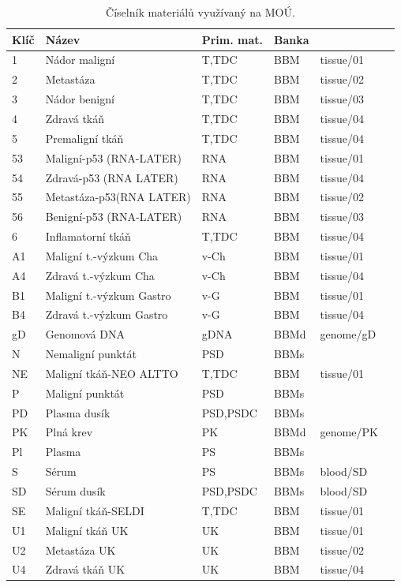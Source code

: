 \begin{table}[ht] 
\centering
\begin{tabular}{l l l l l l}
\hline 
Klíč & Název 	& Prim. mat. & Banka & \ProjectName \\ [0.5ex]  
\hline \hline
1		&	Nádor maligní							&	T,TDC		&		BBM	&	tissue/01 \\
2		&	Metastáza									&	T,TDC		&		BBM	&	tissue/02 \\
3		&	Nádor benigní							&	T,TDC		&		BBM	&	tissue/03 \\
4		&	Zdravá tkáň								&	T,TDC		&		BBM	&	tissue/04 \\
5		&	Premaligní tkáň						&	T,TDC		&		BBM	&	tissue/04 \\
53	&	Maligní-p53 (RNA-LATER)		&	RNA			&		BBM	&	tissue/01 \\
54	&	Zdravá-p53 (RNA LATER)		&	RNA			&		BBM	&	tissue/04 \\
55	&	Metastáza-p53(RNA LATER)	&	RNA			&		BBM	&	tissue/02 \\
56	&	Benigní-p53 (RNA-LATER)		&	RNA			&		BBM	&	tissue/03 \\
6		&	Inflamatorní tkáň					&	T,TDC		&		BBM	&	tissue/04 \\
A1	&	Maligní t.-výzkum Cha			&	v-Ch		&		BBM	&	tissue/01 \\
A4	&	Zdravá t.-výzkum Cha			&	v-Ch		&		BBM	&	tissue/04 \\
B1	&	Maligní t.-výzkum Gastro	&	v-G			&		BBM	&	tissue/01 \\
B4	&	Zdravá t.-výzkum Gastro		&	v-G			&		BBM	&	tissue/04 \\
gD	&	Genomová DNA							&	gDNA		&		BBMd&	genome/gD \\
N		&	Nemaligní punktát					&	PSD			&		BBMs& 					\\	
NE	&	Maligní tkáň-NEO ALTTO		&	T,TDC		&		BBM	&	tissue/01 \\
P		&	Maligní punktát						&	PSD			&		BBMs&	 					\\
PD	&	Plasma dusík							&	PSD,PSDC&		BBMs&	 					\\
PK	&	Plná krev									&	PK			&		BBMd&	genome/PK \\
Pl	&	Plasma										&	PS			&		BBMs& 	 				\\
S~	&	Sérum											&	PS			&		BBMs&	blood/SD 	\\
SD	&	Sérum dusík								&	PSD,PSDC&		BBMs&	blood/SD 	\\
SE	&	Maligní tkáň-SELDI				&	T,TDC		&		BBM	&	tissue/01 \\
U1	&	Maligní tkáň UK						&	UK			&		BBM	&	tissue/01 \\
U2	&	Metastáza UK							&	UK			&		BBM	&	tissue/02 \\
U4	&	Zdravá tkáň UK						&	UK			&		BBM	&	tissue/04 \\

\hline %
\end{tabular} 
\caption{Číselník materiálů využívaný na MOÚ.}
\label{tab:ciselnik-mat-muni}
\end{table} 


